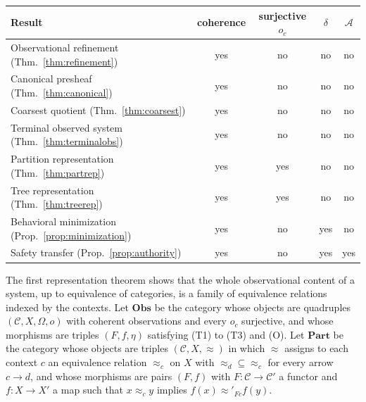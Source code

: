 \documentclass[11pt]{article}
\theoremstyle{definition}
\theoremstyle{remark}
\newcommand{\cC}{\mathcal C}
\newcommand{\cA}{\mathcal A}
\newcommand{\Obs}{\mathbf{Obs}}
\newcommand{\Part}{\mathbf{Part}}
\begin{document}
\begin{center}
\small
\begin{tabular}{lcccc}
\toprule
Result & coherence & surjective $o_c$ & $\delta$ & $\cA$\\
\midrule
Observational refinement (Thm.~\ref{thm:refinement}) & yes & no & no & no\\
Canonical presheaf (Thm.~\ref{thm:canonical}) & yes & no & no & no\\
Coarsest quotient (Thm.~\ref{thm:coarsest}) & yes & no & no & no\\
Terminal observed system (Thm.~\ref{thm:terminalobs}) & yes & no & no & no\\
Partition representation (Thm.~\ref{thm:partrep}) & yes & yes & no & no\\
Tree representation (Thm.~\ref{thm:treerep}) & yes & yes & no & no\\
Behavioral minimization (Prop.~\ref{prop:minimization}) & yes & no & yes & no\\
Safety transfer (Prop.~\ref{prop:authority}) & yes & no & yes & yes\\
\bottomrule
\end{tabular}
\end{center}

The first representation theorem shows that the whole observational content of a system, up to equivalence of categories, is a family of equivalence relations indexed by the contexts. Let $\Obs$ be the category whose objects are quadruples $(\cC,X,\Omega,o)$ with coherent observations and every $o_c$ surjective, and whose morphisms are triples $(F,f,\eta)$ satisfying (T1) to (T3) and (O). Let $\Part$ be the category whose objects are triples $(\cC,X,{\approx})$ in which $\approx$ assigns to each context $c$ an equivalence relation $\approx_c$ on $X$ with ${\approx_d}\subseteq{\approx_c}$ for every arrow $c\to d$, and whose morphisms are pairs $(F,f)$ with $F:\cC\to\cC'$ a functor and $f:X\to X'$ a map such that $x\approx_cy$ implies $f(x)\approx'_{Fc}f(y)$.
\end{document}

